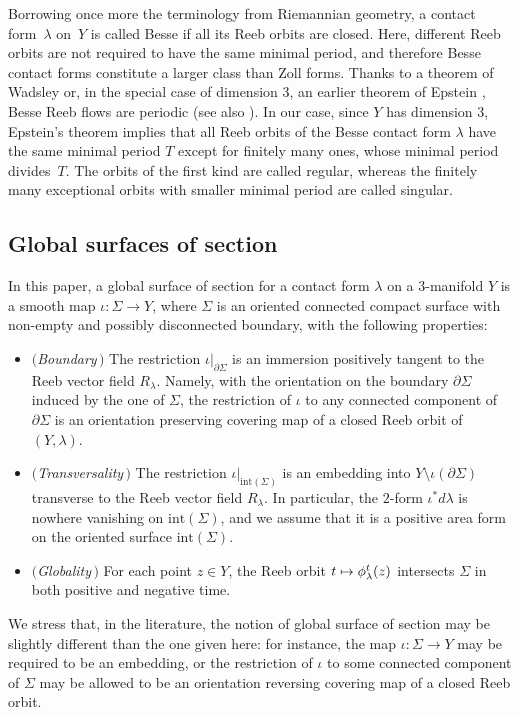 \documentclass[10pt,a4paper]{amsart}
\numberwithin{equation}{section}
\newcommand\mto{\mathchoice{\longmapsto}{\mapsto}{\mapsto}{\mapsto}}
\theoremstyle{definition}
\let\diff d
\begin{document}
Borrowing once more the terminology from Riemannian geometry, a contact form~$\lambda$ on~$Y$ is called Besse if all its Reeb orbits are closed. Here, different Reeb orbits are not required to have the same minimal period, and therefore Besse contact forms constitute a larger class than Zoll forms. Thanks to a theorem of Wadsley \cite{Wadsley:1975sp} or, in the special case of dimension $3$, an earlier theorem of Epstein \cite{Epstein:1972}, Besse Reeb flows are periodic (see also \cite{Sullivan:1978}). In our case, since $Y$ has dimension $3$, Epstein's theorem implies that all Reeb orbits of the Besse contact form $\lambda$ have the same minimal period $T$ except for finitely many ones, whose minimal period divides~$T$. The orbits of the first kind are called regular, whereas the finitely many exceptional orbits with smaller minimal period are called singular.

\subsection{Global surfaces of section}
\label{s:sos_def}
In this paper, a global surface of section for a contact form $\lambda$ on a $3$-manifold $Y$ is a smooth map $\iota:\Sigma\to Y$, where $\Sigma$ is an oriented connected compact surface with non-empty and possibly disconnected boundary, with the following properties:
\begin{itemize}

\item \textit{$($Boundary$\,)$} The restriction $\iota|_{\partial\Sigma}$ is an immersion positively tangent to the Reeb vector field $R_{\lambda}$. Namely, with the orientation on the boundary $\partial\Sigma$ induced by the one of $\Sigma$,
the restriction of $\iota$ to any connected component of $\partial\Sigma$ is an orientation preserving covering map of a closed Reeb orbit of $(Y,\lambda)$.\vspace{2pt}

\item \textit{$($Transversality$\,)$} The restriction $\iota|_{\mathrm{int}(\Sigma)}$ is an embedding into $Y\setminus\iota(\partial\Sigma)$ transverse to the Reeb vector field $R_\lambda$.
In particular, the $2$-form $\iota^*\diff\lambda$ is nowhere vanishing on $\mathrm{int}(\Sigma)$, and we assume that it is a positive area form on the oriented surface $\mathrm{int}(\Sigma)$.\vspace{2pt}

\item \textit{$($Globality$\,)$} For each point $z\in Y$, the Reeb orbit $t\mto\phi_\lambda^t(z)$ intersects $\Sigma$ in both positive and negative time.

\end{itemize}
We stress that, in the literature, the notion of global surface of section may be slightly different than the one given here: for instance, the map $\iota:\Sigma\to Y$ may be required to be an embedding, or the restriction of $\iota$ to some connected component of $\Sigma$ may be allowed to be an orientation reversing covering map of a closed Reeb orbit.
\end{document}
